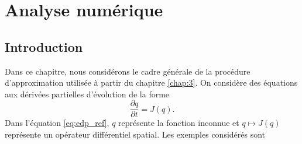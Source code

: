 \chapter{Analyse numérique}
\label{chap:2}

\section{Introduction}

Dans ce chapitre, nous considérons le cadre générale de la procédure d'approximation utilisée à partir du chapitre \ref{chap:3}. On considère des équations aux dérivées partielles d'évolution de la forme
\begin{equation}
\dfrac{\partial q}{\partial t} = J(q).
\label{eq:edp_ref}
\end{equation}
Dans l'équation \eqref{eq:edp_ref}, $q$ représente la fonction inconnue et $q \mapsto J(q)$ représente un opérateur différentiel spatial. Les exemples considérés sont
